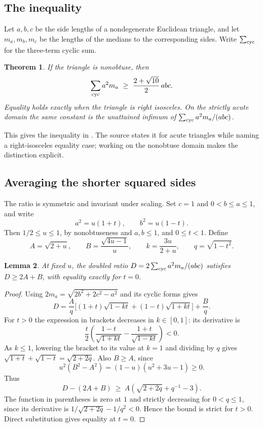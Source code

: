 \documentclass[11pt,a4paper]{article}
\numberwithin{equation}{section}
\newtheorem{theorem}{Theorem}[section]
\newtheorem{lemma}[theorem]{Lemma}
\theoremstyle{definition}
\theoremstyle{remark}
\begin{document}
\subsection*{The inequality}
Let $a,b,c$ be the side lengths of a nondegenerate Euclidean triangle,
and let $m_a,m_b,m_c$ be the lengths of the medians to the corresponding
sides. Write $\sum_{\rm cyc}$ for the three-term cyclic sum.
\begin{theorem}
If the triangle is nonobtuse, then
\[
 \sum_{\rm cyc}a^2m_a\ \geq\ \frac{2+\sqrt{10}}2\,abc .
\]
Equality holds exactly when the triangle is right isosceles. On the
strictly acute domain the same constant is the unattained infimum of
$\sum_{\rm cyc}a^2m_a/(abc)$.
\end{theorem}
This gives the inequality in \cite[Conjecture 4, (4.4)]{r29reiwa:liu}. The source
states it for acute triangles while naming a right-isosceles equality
case; working on the nonobtuse domain makes the distinction explicit.

\subsection*{Averaging the shorter squared sides}
The ratio is symmetric and invariant under scaling. Set $c=1$ and
$0<b\le a\le1$, and write
\[
 a^2=u(1+t),\qquad b^2=u(1-t).
\]
Then $1/2\le u\le 1$, by nonobtuseness and $a,b\le1$, and $0\le t<1$.
Define
\[
 A=\sqrt{2+u},\qquad B=\frac{\sqrt{4u-1}}{u},\qquad
 k=\frac{3u}{2+u},\qquad q=\sqrt{1-t^2}.
\]
\begin{lemma}
At fixed $u$, the doubled ratio $D=2\sum_{\rm cyc}a^2m_a/(abc)$
satisfies $D\ge 2A+B$, with equality exactly for $t=0$.
\end{lemma}
\begin{proof}
Using $2m_a=\sqrt{2b^2+2c^2-a^2}$ and its cyclic forms gives
\[
 D=\frac A q\big[(1+t)\sqrt{1-kt}+(1-t)\sqrt{1+kt}\big]+\frac B q.
\]
For $t>0$ the expression in brackets decreases in $k\in[0,1]$:
its derivative is
\[
 \frac t2\left(\frac{1-t}{\sqrt{1+kt}}-
                      \frac{1+t}{\sqrt{1-kt}}\right)<0.
\]
As $k\le1$, lowering the bracket to its value at $k=1$ and dividing
by $q$ gives $\sqrt{1+t}+\sqrt{1-t}=\sqrt{2+2q}$.
Also $B\ge A$, since
\[
 u^2(B^2-A^2)=(1-u)(u^2+3u-1)\ge0.
\]
Thus
\[
 D-(2A+B)\ \ge\ A\left(\sqrt{2+2q}+q^{-1}-3\right).
\]
The function in parentheses is zero at $1$ and strictly decreasing
for $0<q\le1$, since its derivative is
$1/\sqrt{2+2q}-1/q^2<0$. Hence the bound is strict for $t>0$.
Direct substitution gives equality at $t=0$.
\end{proof}
\end{document}
